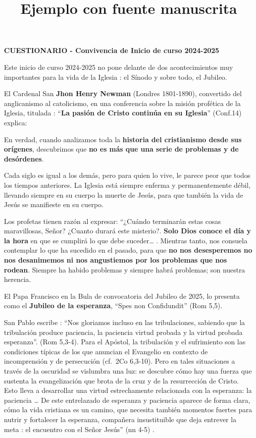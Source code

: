 \documentclass[
  12pt,
]{article}
\title{Ejemplo con fuente manuscrita}
\author{}
\date{\vspace{-2.5em}}
\begin{document}
\maketitle

\textbf{CUESTIONARIO - Convivencia de Inicio de curso  2024-2025}

Este inicio de curso 2024-2025 no pone delante de dos acontecimientos
muy importantes para la vida de la Iglesia : el Sínodo y sobre todo, el
Jubileo.

El Cardenal San \textbf{Jhon Henry Newman} (Londres 1801-1890),
convertido del anglicanismo al catolicismo, en una conferencia sobre la
misión profética de la Iglesia, titulada :
``\textbf{La pasión de Cristo continúa en su Iglesia}'' (Conf.14)
explica:

En verdad, cuando analizamos toda la
\textbf{historia del cristianismo desde sus orígenes}, descubrimos que
\textbf{no es más que una serie de problemas y de desórdenes}.

Cada siglo es igual a los demás, pero para quien lo vive, le parece peor
que todos los tiempos anteriores. La Iglesia está siempre enferma y
permanentemente débil, llevando siempre en su cuerpo la muerte de Jesús,
para que también la vida de Jesús se manifieste en su cuerpo.

Los profetas tienen razón al expresar: ``¿Cuándo terminarán estas cosas
maravillosas, Señor? ¿Cuanto durará este misterio?.
\textbf{Solo Dios conoce el día y la hora} en que se cumplirá lo que
debe suceder\ldots{} . Mientras tanto, nos consuela contemplar lo que ha
sucedido en el pasado, para que
\textbf{no nos desesperemos no nos desanimemos ni nos angustiemos por los problemas que nos rodean}.
Siempre ha habido problemas y siempre habrá problemas; son nuestra
herencia.

El Papa Francisco en la Bula de convocatoria del Jubileo de 2025, lo
presenta como el \textbf{Jubileo de la esperanza}, ``Spes non
Confidundit'' (Rom 5,5).

San Pablo escribe : ``Nos gloriamos incluso en las tribulaciones,
sabiendo que la tribulación produce paciencia, la paciencia virtud
probada y la virtud probada esperanza''. (Rom 5,3-4). Para el Apóstol,
la tribulación y el sufrimiento son las condiciones típicas de los que
anuncian el Evangelio en contexto de incomprensión y de persecución
(cf.~2Co 6,3-10). Pero en tales situaciones a través de la oscuridad se
vislumbra una luz: se descubre cómo hay una fuerza que sustenta la
evangelización que brota de la cruz y de la resurrección de Cristo. Esto
lleva a desarrollar una virtud estrechamente relacionada con la
esperanza: la paciencia \ldots{} De este entrelazado de esperanza y
paciencia aparece de forma clara, cómo la vida cristiana es un camino,
que necesita también momentos fuertes para nutrir y fortalecer la
esperanza, compañera insustituible que deja entrever la meta : el
encuentro con el Señor Jesús'' (nn 4-5) .
\end{document}

